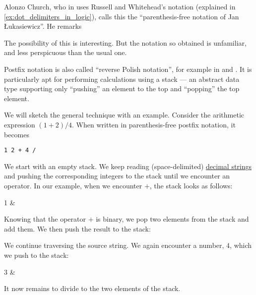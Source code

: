 \begin{remark}
\begin{thmenum}
    Alonzo Church, who in \cite[38]{Church1956LogicVol1} uses Russell and Whitehead's notation (explained in \cref{ex:dot_delimiters_in_logic}), calls this the \enquote{parenthesis-free notation of Jan \L{}ukasiewicz}. He remarks
    \begin{displayquote}
      The possibility of this is interesting. But the notation so obtained is unfamiliar, and less perspicuous than the usual one.
    \end{displayquote}

     Postfix notation is also called \enquote{reverse Polish notation}, for example in \cite[833]{HighamEtAl2015PrincetonCompanion} and \cite[817]{Rosen2019DiscreteMathematics}. It is particularly apt for performing calculations using a stack --- an abstract data type supporting only \enquote{pushing} an element to the top and \enquote{popping} the top element.

    We will sketch the general technique with an example. Consider the arithmetic expression \( (1 + 2) / 4 \). When written in parenthesis-free postfix notation, it becomes
    \begin{center}
      \begin{BVerbatim}[gobble=8]
        1 2 + 4 /
      \end{BVerbatim}
    \end{center}

    We start with an empty stack. We keep reading (space-delimited) \hyperref[def:positional_number_system/decimal]{decimal strings} and pushing the corresponding integers to the stack until we encounter an operator. In our example, when we encounter \( + \), the stack looks as follows:
    \begin{MemoryLine}{2}
      1 & 
    \end{MemoryLine}

    Knowing that the operator \( + \) is binary, we pop two elements from the stack and add them. We then push the result to the stack:
    \begin{MemoryLine}{1}
    \end{MemoryLine}

    We continue traversing the source string. We again encounter a number, \( 4 \), which we push to the stack:
    \begin{MemoryLine}{2}
      3 & 
    \end{MemoryLine}

    It now remains to divide to the two elements of the stack.
  \end{thmenum}
\end{remark}

